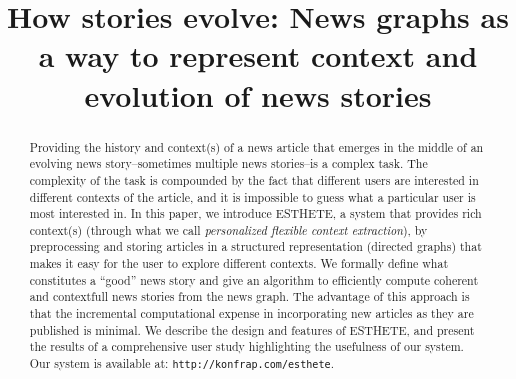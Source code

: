 \documentclass{acm_proc_article-sp}
\begin{document}
\title{How stories evolve: News graphs as a way to represent context and evolution of news stories}

%
\author{
%
}


\maketitle
\begin{abstract}
Providing the history and context(s) of a news article that emerges in
the middle of an evolving news story--sometimes multiple news stories--is
a complex task. The complexity of the task is compounded by the fact that
different users are interested in different contexts of the article, and
it is impossible to guess what a particular user is most interested in. In
this paper, we introduce ESTHETE, a system that provides rich context(s)
(through what we call {\em personalized flexible context
extraction}), by preprocessing and storing articles in a structured
representation (directed graphs) that makes it easy for the user to
explore different contexts. We formally define what constitutes a ``good'' news story and give an algorithm
to efficiently compute coherent and contextfull news stories from the news graph. The advantage of this approach is that the
incremental computational expense in incorporating new articles as they are published is minimal.
We describe the design and features of ESTHETE, and present the results of a comprehensive user study highlighting the usefulness of our system. 
Our system is available at: {\tt http://konfrap.com/esthete}.

\end{abstract}
\end{document}
